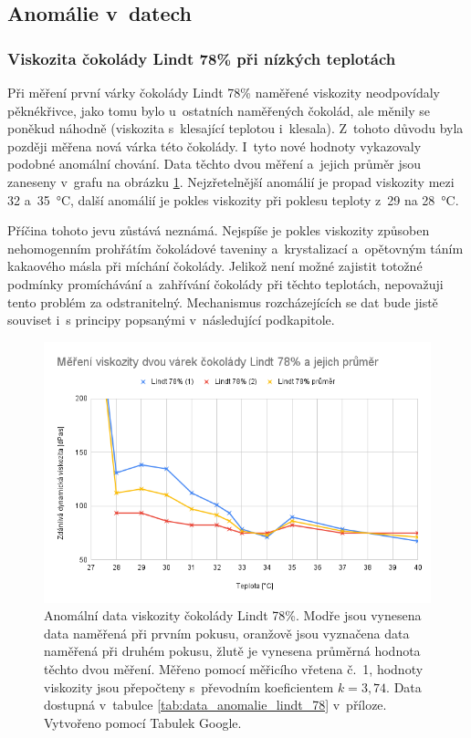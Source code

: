 \documentclass[12pt]{article}
\begin{document}
\subsection{Anomálie v~datech}%

\subsubsection{Viskozita čokolády Lindt 78\% při nízkých teplotách}%

Při měření první várky čokolády Lindt 78\% naměřené viskozity neodpovídaly \glqq pěkné\grqq křivce, jako tomu bylo u~ostatních naměřených čokolád, ale měnily se poněkud náhodně (viskozita s~klesající teplotou i~klesala). Z~tohoto důvodu byla později měřena nová várka této čokolády. I~tyto nové hodnoty vykazovaly podobné anomální chování. Data těchto dvou měření a~jejich průměr jsou zaneseny v~grafu na obrázku \ref{fig:Lindt_78_anomalie}. Nejzřetelnější anomálií je propad viskozity mezi 32 a~\SI{35}{\degreeCelsius}, další anomálií je pokles viskozity při poklesu teploty z~29 na \SI{28}{\degreeCelsius}.
\par\noindent
Příčina tohoto jevu zůstává neznámá. Nejspíše je pokles viskozity způsoben nehomogenním prohřátím čokoládové taveniny a~krystalizací a~opětovným táním kakaového másla při míchání čokolády. Jelikož není možné zajistit totožné podmínky promíchávání a~zahřívání čokolády při těchto teplotách, nepovažuji tento problém za odstranitelný. Mechanismus rozcházejících se dat bude jistě souviset i~s principy popsanými v~následující podkapitole.

\begin{figure}[h!]
    \centering
    \includegraphics[width = \linewidth]{figures/Lindt78.png}
    \caption{Anomální data viskozity čokolády Lindt 78\%. Modře jsou vynesena data naměřená při prvním pokusu, oranžově jsou vyznačena data naměřená při druhém pokusu, žlutě je vynesena průměrná hodnota těchto dvou měření. Měřeno pomocí měřicího vřetena č.~1, hodnoty viskozity jsou přepočteny s~převodním koeficientem $k = 3,74$. Data dostupná v~tabulce \ref{tab:data_anomalie_lindt_78} v~příloze. Vytvořeno pomocí Tabulek Google.}
    \label{fig:Lindt_78_anomalie}
\end{figure}
\end{document}
